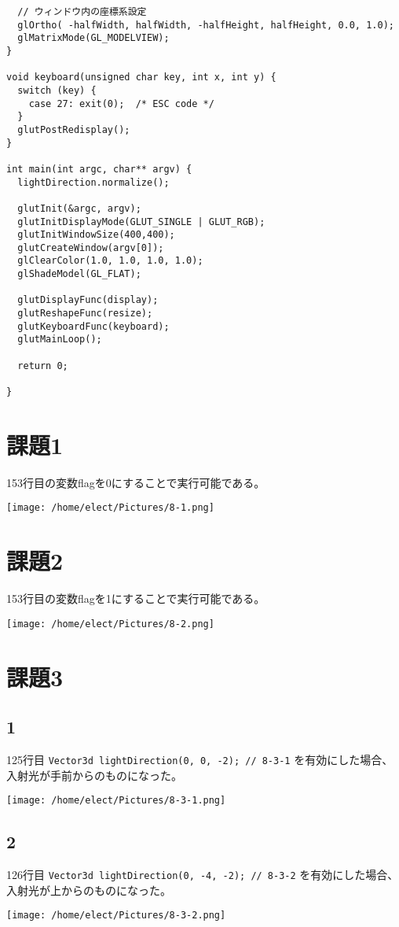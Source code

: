 \documentclass{scrartcl}
\begin{document}
\begin{verbatim}
  // ウィンドウ内の座標系設定
  glOrtho( -halfWidth, halfWidth, -halfHeight, halfHeight, 0.0, 1.0);
  glMatrixMode(GL_MODELVIEW);
}

void keyboard(unsigned char key, int x, int y) {
  switch (key) {
    case 27: exit(0);  /* ESC code */
  }
  glutPostRedisplay();
}

int main(int argc, char** argv) {
  lightDirection.normalize();

  glutInit(&argc, argv);
  glutInitDisplayMode(GLUT_SINGLE | GLUT_RGB);
  glutInitWindowSize(400,400);
  glutCreateWindow(argv[0]);
  glClearColor(1.0, 1.0, 1.0, 1.0);
  glShadeModel(GL_FLAT);

  glutDisplayFunc(display);
  glutReshapeFunc(resize);
  glutKeyboardFunc(keyboard);
  glutMainLoop();

  return 0;

}
\end{verbatim}
\section{課題1}
\label{sec:org4d88458}
153行目の変数flagを0にすることで実行可能である。\\
\begin{center}
\texttt{[image: /home/elect/Pictures/8-1.png]}
\end{center}
\section{課題2}
\label{sec:orgbdcf604}
153行目の変数flagを1にすることで実行可能である。\\
\begin{center}
\texttt{[image: /home/elect/Pictures/8-2.png]}
\end{center}
\section{課題3}
\label{sec:orgc44da04}
\subsection{1}
\label{sec:org1a4500f}
125行目 \texttt{Vector3d lightDirection(0, 0, -2); // 8-3-1} を有効にした場合、入射光が手前からのものになった。\\
\begin{center}
\texttt{[image: /home/elect/Pictures/8-3-1.png]}
\end{center}
\subsection{2}
\label{sec:orgdc10422}
126行目 \texttt{Vector3d lightDirection(0, -4, -2); // 8-3-2} を有効にした場合、入射光が上からのものになった。\\
\begin{center}
\texttt{[image: /home/elect/Pictures/8-3-2.png]}
\end{center}
\end{document}
